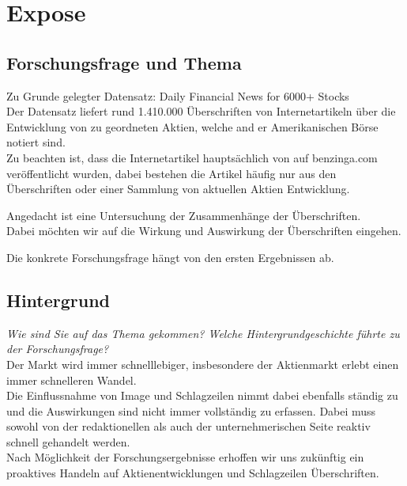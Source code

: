 \chapter{Expose}
\section{Forschungsfrage und Thema}

Zu Grunde gelegter Datensatz: 
Daily Financial News for 6000+ Stocks
\citep[see][]{dailyfinancialnews} \\
Der Datensatz liefert rund 1.410.000 Überschriften von Internetartikeln über die Entwicklung von zu geordneten Aktien, welche and er Amerikanischen Börse notiert sind.\\
Zu beachten ist, dass die Internetartikel hauptsächlich von auf benzinga.com veröffentlicht wurden, dabei bestehen die Artikel häufig nur aus den Überschriften oder einer Sammlung von aktuellen Aktien Entwicklung.

Angedacht ist eine Untersuchung der Zusammenhänge der Überschriften. \\
Dabei möchten wir auf die Wirkung und Auswirkung der Überschriften eingehen.

Die konkrete Forschungsfrage hängt von den ersten Ergebnissen ab.

\section{Hintergrund}
{\scriptsize \textit{Wie sind Sie auf das Thema gekommen? Welche Hintergrundgeschichte führte zu der Forschungsfrage?}}\\
Der Markt wird immer schnelllebiger, insbesondere der Aktienmarkt erlebt einen immer schnelleren Wandel.\\
Die Einflussnahme von Image und Schlagzeilen nimmt dabei ebenfalls ständig zu und die Auswirkungen sind nicht immer vollständig zu erfassen.
Dabei muss sowohl von der redaktionellen als auch der unternehmerischen Seite reaktiv schnell gehandelt werden.\\
Nach Möglichkeit der Forschungsergebnisse erhoffen wir uns zukünftig ein proaktives Handeln auf Aktienentwicklungen und Schlagzeilen Überschriften.

